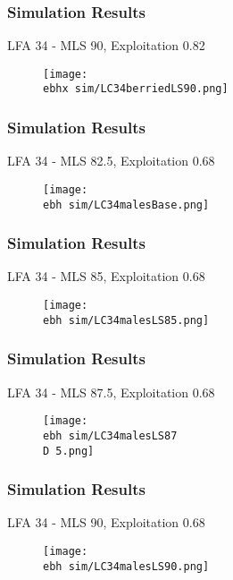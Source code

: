 \documentclass{beamer}
\newcommand{\ebh}{\string~/bio.data/bio.lobster/figures/LFA3438Framework2019/} %
\newcommand{\ebhx}{\string~/bio.data/bio.lobster/figures/LFA3438Framework2019/figures/Brad/} %
\newcommand{\D}{.}
\begin{document}
\begin{frame}
\frametitle{Simulation Results}
LFA 34 - MLS 90, Exploitation 0.82
\begin{figure}
        \begin{center}
            \texttt{[image: \\ebhx sim/LC34berriedLS90.png]}
        \end{center}
    \end{figure}
\end{frame}



\begin{frame}
\frametitle{Simulation Results}
LFA 34 - MLS 82.5, Exploitation 0.68
\begin{figure}
        \begin{center}
            \texttt{[image: \\ebh sim/LC34malesBase.png]}
        \end{center}
    \end{figure}
\end{frame}



\begin{frame}
\frametitle{Simulation Results}
LFA 34 - MLS 85, Exploitation 0.68
\begin{figure}
        \begin{center}
            \texttt{[image: \\ebh sim/LC34malesLS85.png]}
        \end{center}
    \end{figure}
\end{frame}


\begin{frame}
\frametitle{Simulation Results}
LFA 34 - MLS 87.5, Exploitation 0.68
\begin{figure}
        \begin{center}
            \texttt{[image: \\ebh sim/LC34malesLS87\\D 5.png]}
        \end{center}
    \end{figure}
\end{frame}


\begin{frame}
\frametitle{Simulation Results}
LFA 34 - MLS 90, Exploitation 0.68
\begin{figure}
        \begin{center}
            \texttt{[image: \\ebh sim/LC34malesLS90.png]}
        \end{center}
    \end{figure}
\end{frame}
\end{document}
